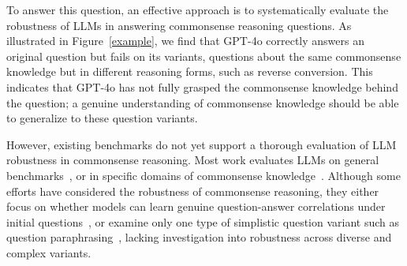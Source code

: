 To answer this question, an effective approach is to systematically evaluate the robustness of LLMs in answering commonsense reasoning questions. 
As illustrated in Figure~\ref{example}, we find that GPT-4o correctly answers an original question but fails on its variants, \ie questions about the same commonsense knowledge but in different reasoning forms, such as reverse conversion. 
This indicates that GPT-4o has not fully grasped the commonsense knowledge behind the question; a genuine understanding of commonsense knowledge should be able to generalize to these question variants. 


However, existing benchmarks do not yet support a thorough evaluation of LLM robustness in commonsense reasoning.
Most work evaluates LLMs on general benchmarks~\cite{zellers2019hellaswag, talmor2019commonsenseqa, mihaylov2018can}, or in specific domains of commonsense knowledge~\cite{zhou2019going, qin2021timedial, bisk2020piqa}. Although some efforts have considered the robustness of commonsense reasoning, they either focus on whether models can learn genuine question-answer correlations under initial questions~\cite{jia2017adversarial,branco2021shortcutted}, or examine only one type of simplistic question variant such as question paraphrasing~\cite{zhou2021rica,ismayilzada-etal-2023-crow,balepur2024s}, lacking investigation into robustness across diverse and complex variants. 


